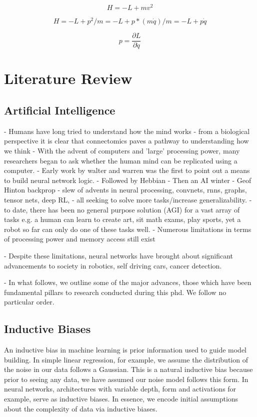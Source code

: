 \documentclass{article}
\begin{document}
$$ H = -L + mv^2$$

$$ H = -L + p^2/m = -L + p* (m\dot{q})/m = -L + p\dot{q}$$

$$ p = \frac{\partial L}{\partial \dot{q}} $$

\section{Literature Review}

\subsection{Artificial Intelligence}

- Humans have long tried to understand how the mind works
- from a biological perspective it is clear that connectomics paves a pathway to understanding how we think
- With the advent of computers and 'large' processing power, many researchers began to ask whether the human mind can be replicated using a computer.
- Early work by walter and warren was the first to point out a means to build neural network logic.
- Followed by Hebbian
- Then an AI winter
- Geof Hinton backprop
- slew of advents in neural processing, convnets, rnns, graphs, tensor nets, deep RL, 
- all seeking to solve more tasks/increase generalizability.
- to date, there has been no general purpose solution (AGI) for a vast array of tasks e.g. a human can learn to create art, sit math exams, play sports, yet a robot so far can only do one of these tasks well.
- Numerous limitations in terms of processing power and memory access still exist

- Despite these limitations, neural networks have brought about significant advancements to society in robotics, self driving cars, cancer detection.

- In what follows, we outline some of the major advances, those which have been fundamental pillars to research conducted during this phd. We follow no particular order.

\subsection{Inductive Biases}

An inductive bias in machine learning is prior information used to guide model building. In simple linear regression, for example, we assume the distribution of the noise in our data follows a Gaussian. This is a natural inductive bias because prior to seeing any data, we have assumed our noise model follows this form. In neural networks, architectures with variable depth, form and activations for example, serve as inductive biases. In essence, we encode initial assumptions about the complexity of data via inductive biases. 
\end{document}
